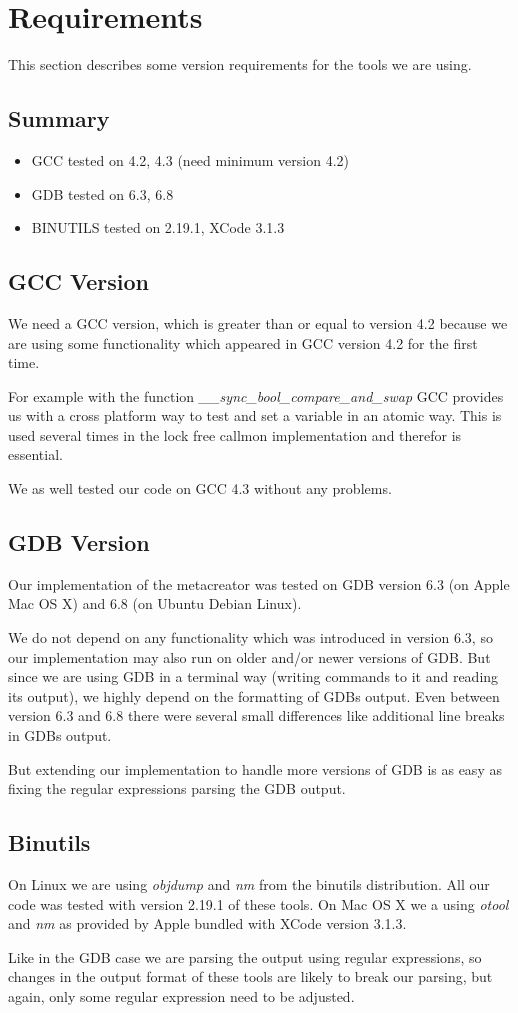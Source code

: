 \section{Requirements} This section describes some version requirements for the tools we are using. 

\subsection{Summary}
\begin{itemize}
	\item GCC tested on 4.2, 4.3 (need minimum version 4.2)
	\item GDB tested on 6.3, 6.8
	\item BINUTILS tested on 2.19.1, XCode 3.1.3
\end{itemize}

\subsection{GCC Version} We need a GCC version, which is greater than or equal to version 4.2 because we are using some functionality which appeared in GCC version 4.2 for the first time.

For example with the function \emph{\_\_sync\_bool\_compare\_and\_swap} GCC provides us with a cross platform way to test and set a variable in an atomic way. This is used several times in the lock free callmon implementation and therefor is essential.

We as well tested our code on GCC 4.3 without any problems.

\subsection{GDB Version} Our implementation of the metacreator was tested on GDB version 6.3 (on Apple Mac OS X) and 6.8 (on Ubuntu Debian Linux).

We do not depend on any functionality which was introduced in version 6.3, so our implementation may also run on older and/or newer versions of GDB. But since we are using GDB in a terminal way (writing commands to it and reading its output), we highly depend on the formatting of GDBs output. Even between version 6.3 and 6.8 there were several small differences like additional line breaks in GDBs output.

But extending our implementation to handle more versions of GDB is as easy as fixing the regular expressions parsing the GDB output.

\subsection{Binutils} On Linux we are using \emph{objdump} and \emph{nm} from the binutils distribution. All our code was tested with version 2.19.1 of these tools. On Mac OS X we a using \emph{otool} and \emph{nm} as provided by Apple bundled with XCode version 3.1.3.

Like in the GDB case we are parsing the output using regular expressions, so changes in the output format of these tools are likely to break our parsing, but again, only some regular expression need to be adjusted.
